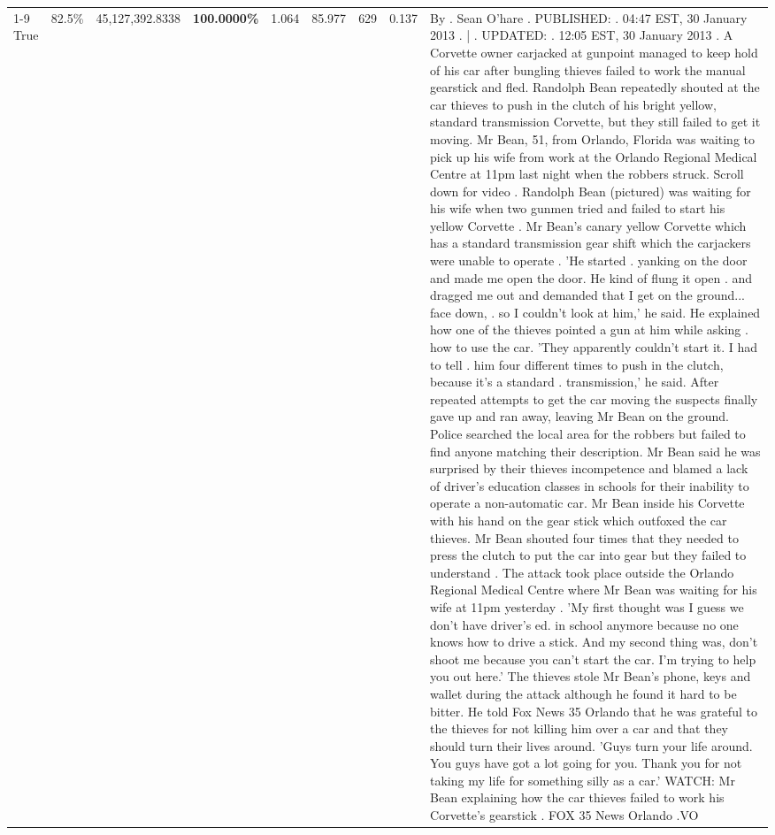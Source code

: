 \begin{table}[H]
\begin{tabular}{lllrlllll}
\cline{1-9} \cline{2-9}
True & 82.5\% & 45,127,392.8338 & \bfseries \color{red} 100.0000\% & 1.064 & 85.977 & 629 & 0.137 & By . Sean O'hare . PUBLISHED: . 04:47 EST, 30 January 2013 . | . UPDATED: . 12:05 EST, 30 January 2013 . A Corvette owner carjacked at gunpoint managed to keep hold of his car after bungling thieves failed to work the manual gearstick and fled. Randolph Bean repeatedly shouted at the car thieves to push in the clutch of his bright yellow, standard transmission Corvette, but they still failed to get it moving. Mr Bean, 51, from Orlando, Florida was waiting to pick up his wife from work at the Orlando Regional Medical Centre at 11pm last night when the robbers struck. Scroll down for video . Randolph Bean (pictured) was waiting for his wife when two gunmen tried and failed to start his yellow Corvette . Mr Bean's canary yellow Corvette which has a standard transmission gear shift which the carjackers were unable to operate . 'He started . yanking on the door and made me open the door. He kind of flung it open . and dragged me out and demanded that I get on the ground... face down, . so I couldn't look at him,' he said. He explained how one of the thieves pointed a gun at him while asking . how to use the car. 'They apparently couldn't start it. I had to tell . him four different times to push in the clutch, because it's a standard . transmission,' he said. After repeated attempts to get the car moving the suspects finally gave up and ran away, leaving Mr Bean on the ground. Police searched the local area for the robbers but failed to find anyone matching their description. Mr Bean said he was surprised by their thieves incompetence and blamed a lack of driver's education classes in schools for their inability to operate a non-automatic car. Mr Bean inside his Corvette with his hand on the gear stick which outfoxed the car thieves. Mr Bean shouted four times that they needed to press the clutch to put the car into gear but they failed to understand . The attack took place outside the Orlando Regional Medical Centre where Mr Bean was waiting for his wife at 11pm yesterday . 'My first thought was I guess we don't have driver's ed. in school anymore because no one knows how to drive a stick. And my second thing was, don't shoot me because you can't start the car. I'm trying to help you out here.' The thieves stole Mr Bean's phone, keys and wallet during the attack although he found it hard to be bitter. He told Fox News 35 Orlando that he was grateful to the thieves for not killing him over a car and that they should turn their lives around. 'Guys turn your life around. You guys have got a lot going for you. Thank you for not taking my life for something silly as a car.' WATCH: Mr Bean explaining how the car thieves failed to work his Corvette's gearstick . FOX 35 News Orlando .VO \\

\end{tabular}
\end{table}
